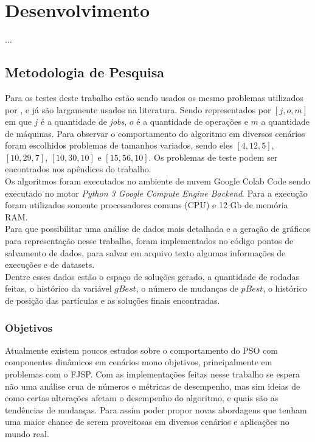\chapter{Desenvolvimento}
    ...


\section{Metodologia de Pesquisa}
Para os testes deste trabalho estão sendo usados os mesmo problemas utilizados por \cite{Kacem2002}, e já são largamente usados na literatura. Sendo representados por $[j, o, m]$ em que $j$ é a quantidade de \textit{jobs}, $o$ é a quantidade de operações e $m$ a quantidade de máquinas. Para observar o comportamento do algoritmo em diversos cenários foram escolhidos problemas de tamanhos variados, sendo eles $[4, 12, 5]$, $[10, 29, 7]$, $[10, 30, 10]$ e $[15, 56, 10]$. Os problemas de teste podem ser encontrados nos apêndices do trabalho.\\
%
\indent Os algoritmos foram executados no ambiente de nuvem Google Colab Code sendo executado no motor \textit{Python 3 Google Compute Engine Backend}. Para a execução foram utilizados somente processadores comuns (CPU) e 12 Gb de memória RAM.\\
%
%
\indent Para que possibilitar uma análise de dados mais detalhada e a geração de gráficos para representação nesse trabalho, foram implementados no código pontos de salvamento de dados, para salvar em arquivo texto algumas informações de execuções e de datasets.\\
\indent Dentre esses dados estão o espaço de soluções gerado, a quantidade de rodadas feitas, o histórico da variável $gBest$, o número de mudanças de $pBest$, o histórico de posição das partículas e as soluções finais encontradas.

\subsection{Objetivos}
Atualmente existem poucos estudos sobre o comportamento do PSO com componentes dinâmicos em cenários mono objetivos, principalmente em problemas com o FJSP. 
%
Com as implementações feitas nesse trabalho se espera não uma análise crua de números e métricas de desempenho, mas sim ideias de como certas alterações afetam o desempenho do algoritmo, e quais são as tendências de mudanças.
%
Para assim poder propor novas abordagens que tenham uma maior chance de serem proveitosas em diversos cenários e aplicações no mundo real.


